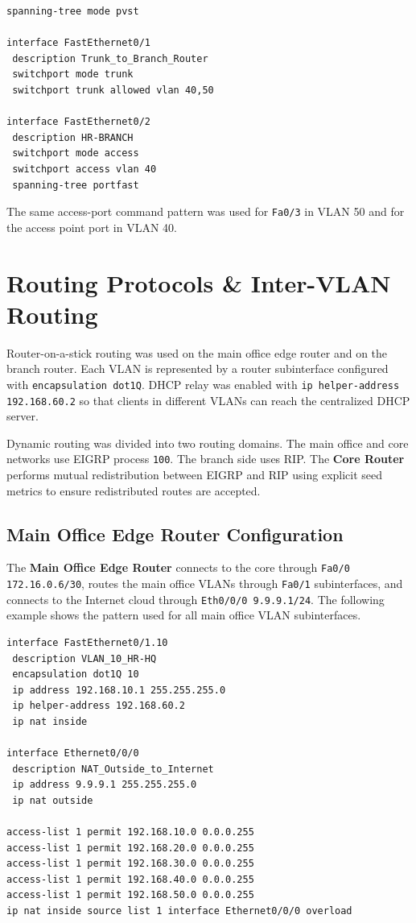 \documentclass[12pt,a4paper]{article}
\begin{document}
\begin{lstlisting}[caption={Simplified branch switch command pattern.}]
spanning-tree mode pvst

interface FastEthernet0/1
 description Trunk_to_Branch_Router
 switchport mode trunk
 switchport trunk allowed vlan 40,50

interface FastEthernet0/2
 description HR-BRANCH
 switchport mode access
 switchport access vlan 40
 spanning-tree portfast
\end{lstlisting}

The same access-port command pattern was used for \texttt{Fa0/3} in VLAN 50 and for the access point port in VLAN 40.

\section{Routing Protocols \& Inter-VLAN Routing}

Router-on-a-stick routing was used on the main office edge router and on the branch router. Each VLAN is represented by a router subinterface configured with \texttt{encapsulation dot1Q}. DHCP relay was enabled with \texttt{ip helper-address 192.168.60.2} so that clients in different VLANs can reach the centralized DHCP server.

Dynamic routing was divided into two routing domains. The main office and core networks use EIGRP process \texttt{100}. The branch side uses RIP. The \textbf{Core Router} performs mutual redistribution between EIGRP and RIP using explicit seed metrics to ensure redistributed routes are accepted.

\subsection{Main Office Edge Router Configuration}

The \textbf{Main Office Edge Router} connects to the core through \texttt{Fa0/0 172.16.0.6/30}, routes the main office VLANs through \texttt{Fa0/1} subinterfaces, and connects to the Internet cloud through \texttt{Eth0/0/0 9.9.9.1/24}. The following example shows the pattern used for all main office VLAN subinterfaces.

\begin{lstlisting}[caption={Simplified edge router inter-VLAN and NAT command pattern.}]
interface FastEthernet0/1.10
 description VLAN_10_HR-HQ
 encapsulation dot1Q 10
 ip address 192.168.10.1 255.255.255.0
 ip helper-address 192.168.60.2
 ip nat inside

interface Ethernet0/0/0
 description NAT_Outside_to_Internet
 ip address 9.9.9.1 255.255.255.0
 ip nat outside

access-list 1 permit 192.168.10.0 0.0.0.255
access-list 1 permit 192.168.20.0 0.0.0.255
access-list 1 permit 192.168.30.0 0.0.0.255
access-list 1 permit 192.168.40.0 0.0.0.255
access-list 1 permit 192.168.50.0 0.0.0.255
ip nat inside source list 1 interface Ethernet0/0/0 overload
\end{lstlisting}
\end{document}
